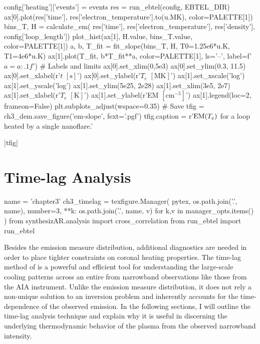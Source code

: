 \begin{pycode}
config['heating']['events'] = events
res = run_ebtel(config, EBTEL_DIR)
ax[0].plot(res['time'], res['electron_temperature'].to(u.MK), color=PALETTE[1])
bins_T, H = calculate_em(
    res['time'], res['electron_temperature'], res['density'], config['loop_length'])
plot_hist(ax[1], H.value, bins_T.value, color=PALETTE[1])
a, b, T_fit = fit_slope(bins_T, H, T0=1.25e6*u.K, T1=4e6*u.K)
ax[1].plot(T_fit, b*T_fit**a, color=PALETTE[1], ls='--', label=f'$a={a:.1f}$')
# Labels and limits
ax[0].set_xlim(0,5e3)
ax[0].set_ylim(0.3, 11.5)
ax[0].set_xlabel(r'$t$ $[\si{\second}]$')
ax[0].set_ylabel(r'$T_e$ $[\si{\mega\kelvin}]$')
ax[1].set_xscale('log')
ax[1].set_yscale('log')
ax[1].set_ylim(5e25, 2e28)
ax[1].set_xlim(3e5, 2e7)
ax[1].set_xlabel(r'$T_e$ $[\si{\kelvin}]$')
ax[1].set_ylabel(r'EM $[\si{\cm\tothe{-5}}]$')
ax[1].legend(loc=2, frameon=False)
plt.subplots_adjust(wspace=0.35)
# Save
tfig = ch3_dem.save_figure('em-slope', fext='.pgf')
tfig.caption = r'$\textup{EM}(T_e)$ for a loop heated by a single nanoflare.'
\end{pycode}
|tfig|

\section{Time-lag Analysis}\label{sec:timelag}

\begin{pycode}
name = 'chapter3'
ch3_timelag = texfigure.Manager(
    pytex,
    os.path.join('.', name),
    number=3,
    **{k: os.path.join('.', name, v) for k,v in manager_opts.items()}
)
from synthesizAR.analysis import cross_correlation
from run_ebtel import run_ebtel
\end{pycode}

Besides the emission measure distribution, additional diagnostics are needed in order to place tighter constraints on coronal heating properties. The time-lag method of \citet{viall_evidence_2012} is a powerful and efficient tool for understanding the large-scale cooling patterns across an entire \AR{} from narrowband observations like those from the AIA instrument. Unlike the emission measure distribution, it does not rely a non-unique solution to an inversion problem and inherently accounts for the time-dependence of the observed emission. In the following sections, I will outline the time-lag analysis technique and explain why it is useful in discerning the underlying thermodynamic behavior of the plasma from the observed narrowband intensity. 

